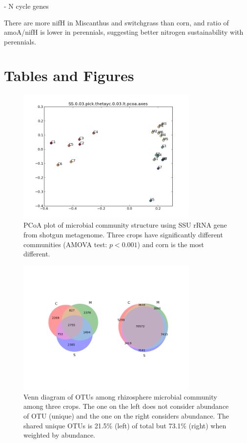 \documentclass[12pt]{article}
\begin{document}
- N cycle genes

There are more nifH in Miscanthus and switchgrass than corn, and ratio of amoA/nifH is lower in perennials, suggesting better nitrogen sustainability with perennials.

\section{Tables and Figures}

    \begin{figure}[tbph!]
    \centering
    \includegraphics[width=0.8\textwidth]{figures/otu-pcoa.png}
    \caption[PCoA plot of microbial community structure using SSU rRNA gene]{PCoA plot of microbial community structure using SSU rRNA gene from shotgun metagenome. Three crops have significantly different communities (AMOVA test: $p < 0.001$) and corn is the most different.}
    \label{fig:otu-pcoa}
    \end{figure}


    \begin{figure}[tbph!]
    \centering
    \includegraphics[width=0.8\textwidth]{figures/otu-venn}
    \caption[Venn diagram of OTUs]{Venn diagram of OTUs among rhizosphere microbial community among three crops. The one on the left does not consider abundance of OTU (unique) and the one on the right considers abundance. The shared unique OTUs is 21.5\% (left) of total but 73.1\% (right) when weighted by abundance.}
    \label{fig:otu-venn}
    \end{figure}
\end{document}
